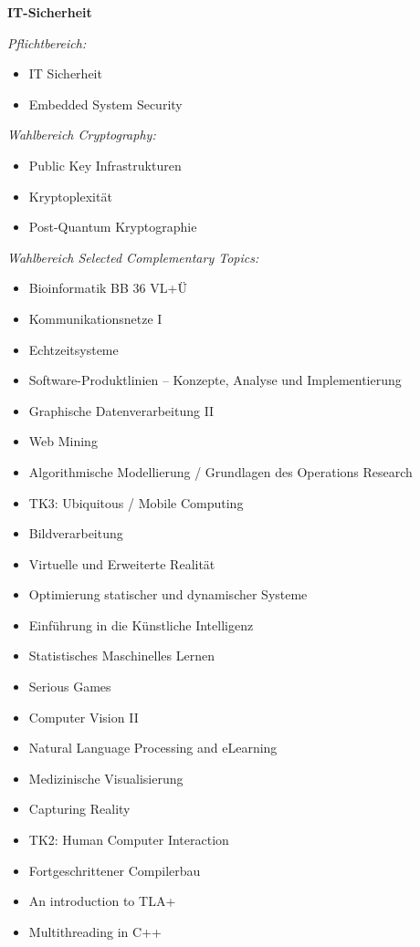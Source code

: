 {\noindent\textbf{IT-Sicherheit}

\textit{Pflichtbereich:}
\begin{itemize}[noitemsep]
  \item IT Sicherheit
  \item Embedded System Security
\end{itemize}
\textit{Wahlbereich Cryptography:}
\begin{itemize}[noitemsep]
  \item Public Key Infrastrukturen
  \item Kryptoplexität
  \item Post-Quantum Kryptographie
\end{itemize}
\textit{Wahlbereich Selected Complementary Topics:}
\begin{itemize}[noitemsep]
  \item Bioinformatik BB 36 VL+Ü
  \item Kommunikationsnetze I
  \item Echtzeitsysteme
  \item Software-Produktlinien – Konzepte, Analyse und Implementierung
  \item Graphische Datenverarbeitung II
  \item Web Mining
  \item Algorithmische Modellierung / Grundlagen des Operations Research
  \item TK3: Ubiquitous / Mobile Computing
  \item Bildverarbeitung
  \item Virtuelle und Erweiterte Realität
  \item Optimierung statischer und dynamischer Systeme
  \item Einführung in die Künstliche Intelligenz
  \item Statistisches Maschinelles Lernen
  \item Serious Games
  \item Computer Vision II
  \item Natural Language Processing and eLearning
  \item Medizinische Visualisierung
  \item Capturing Reality
  \item TK2: Human Computer Interaction
  \item Fortgeschrittener Compilerbau
  \item An introduction to TLA+
  \item Multithreading in C++
\end{itemize}
}
